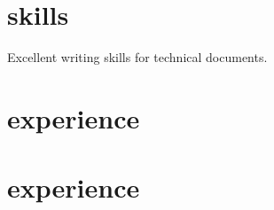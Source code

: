 \documentclass[]{cv-style}          %
\begin{document}
\section{skills}
  \vspace{-0.2cm}
Excellent writing skills for technical documents. 
 



\section{experience}
    \section{experience}
\end{document}
